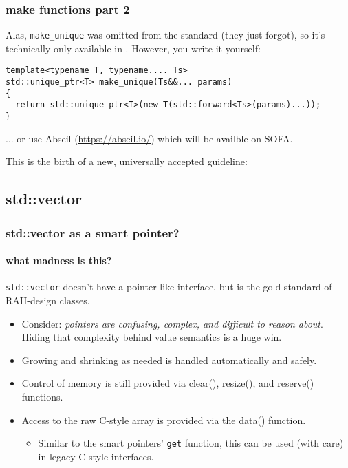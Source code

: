 \begin{frame}[fragile]
\frametitle{make functions part 2}

Alas, \texttt{make\_unique} was omitted from the  standard (they
just forgot), so it's technically only available in .  However,
you write it yourself:

{\scriptsize\begin{verbatim}
template<typename T, typename.... Ts>
std::unique_ptr<T> make_unique(Ts&&... params) 
{
  return std::unique_ptr<T>(new T(std::forward<Ts>(params)...));
}
\end{verbatim}}
\vskip 12pt
... or use Abseil (\url{https://abseil.io/}) which will be availble on SOFA.
\vskip 12pt

\begin{center}
This is the birth of a new, universally accepted  guideline: 
\vskip 6pt
\end{center}
\end{frame}




\subsection{std::vector}

\begin{frame}[fragile]
\frametitle{std::vector as a smart pointer?}
\framesubtitle{what madness is this?}

\texttt{std::vector} doesn't have a pointer-like interface, but is the
gold standard of RAII-design classes.

\begin{itemize}

\item Consider: \emph{pointers are confusing, complex, and difficult
  to reason about}.  Hiding that complexity behind value semantics is
  a huge win.

\item Growing and shrinking as needed is handled automatically and safely.

\item Control of memory is still provided via clear(), resize(), and
  reserve() functions.

\item Access to the raw C-style array is provided via the data()
  function.
\begin{itemize}
  \item Similar to the smart pointers' \texttt{get} function, this can
    be used (with care) in legacy C-style interfaces.
\end{itemize}
\end{itemize}

\end{frame}

